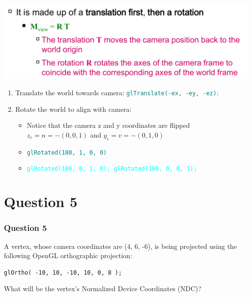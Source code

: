 \documentclass{beamer}
\begin{document}
\begin{frame}

    \begin{center}
        \includegraphics[scale=0.3]{mview.png}
    \end{center}

    \begin{enumerate}
        \item Translate the world towards camera: \textcolor{teal}{\texttt{glTranslate(-ex, -ey, -ez)};}
        \item Rotate the world to align with camera: 
        \begin{itemize}
            \item Notice that the camera z and y coordinates are flipped $z_c = n = -(0,0,1)$ and $y_c = v = -(0,1,0)$
            \item \textcolor{teal}{\texttt{glRotated(180, 1, 0, 0)}}
            \item \textcolor{cyan}{\texttt{glRotated(180, 0, 1, 0); glRotated(180, 0, 0, 1);}}
        \end{itemize}
    \end{enumerate}

\end{frame}

\section{Question 5}

\begin{frame}
    \frametitle{Question 5}
    A vertex, whose camera coordinates are (4, 6, -6), is being projected using the following OpenGL orthographic projection:

    \vspace{1em}

    \begin{tcolorbox}[colback=violet!5!white]
        \centering
        \texttt{glOrtho( -10, 10, -10, 10, 0, 8 );}
    \end{tcolorbox}

    \vspace{1em}

    What will be the vertex's Normalized Device Coordinates (NDC)?
\end{frame}
\end{document}
